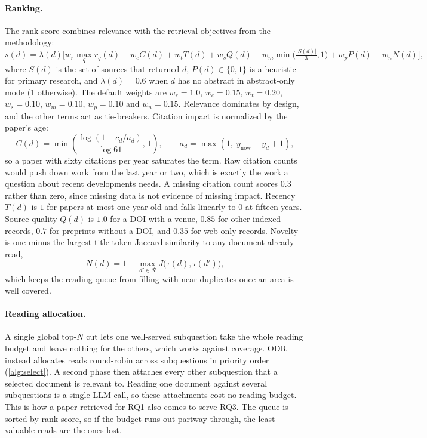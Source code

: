 \documentclass{article}
\newcommand{\sys}{ODR}
\begin{document}
\paragraph{Ranking.} The rank score combines relevance with the retrieval
objectives from the methodology:
\begin{equation}
\label{eq:rank}
s(d) = \lambda(d)\Big[
  w_r \max_q r_q(d) + w_c C(d) + w_t T(d) + w_s Q(d)
  + w_m \min\!\big(\tfrac{|S(d)|}{3},1\big) + w_p P(d) + w_n N(d)
\Big],
\end{equation}
where $S(d)$ is the set of sources that returned $d$, $P(d)\in\{0,1\}$ is a
heuristic for primary research, and $\lambda(d)=0.6$ when $d$ has no
abstract in abstract-only mode (1 otherwise). The default weights are
$w_r=1.0$, $w_c=0.15$, $w_t=0.20$, $w_s=0.10$, $w_m=0.10$, $w_p=0.10$ and
$w_n=0.15$. Relevance dominates by design, and the other terms act as
tie-breakers. Citation impact is normalized by the paper's age:
\begin{equation}
C(d) = \min\!\left(\frac{\log(1 + c_d / a_d)}{\log 61},\, 1\right),
\qquad a_d = \max(1,\; y_{\text{now}} - y_d + 1),
\end{equation}
so a paper with sixty citations per year saturates the term. Raw citation
counts would push down work from the last year or two, which is exactly the
work a question about recent developments needs. A missing citation count
scores $0.3$ rather than zero, since missing data is not evidence of
missing impact. Recency $T(d)$ is $1$ for papers at most one year old and
falls linearly to $0$ at fifteen years. Source quality $Q(d)$ is $1.0$ for
a DOI with a venue, $0.85$ for other indexed records, $0.7$ for preprints
without a DOI, and $0.35$ for web-only records. Novelty is one minus the
largest title-token Jaccard similarity to any document already read,
\begin{equation}
N(d) = 1 - \max_{d' \in \mathcal{R}} J\big(\tau(d), \tau(d')\big),
\end{equation}
which keeps the reading queue from filling with near-duplicates once an
area is well covered.

\paragraph{Reading allocation.} A single global top-$N$ cut lets one
well-served subquestion take the whole reading budget and leave nothing
for the others, which works against coverage. \sys{} instead allocates
reads round-robin across subquestions in priority order
(\cref{alg:select}). A second phase then attaches every other subquestion
that a selected document is relevant to. Reading one document against
several subquestions is a single LLM call, so these attachments cost no
reading budget. This is how a paper retrieved for RQ1 also comes to serve
RQ3. The queue is sorted by rank score, so if the budget runs out partway
through, the least valuable reads are the ones lost.
\end{document}
